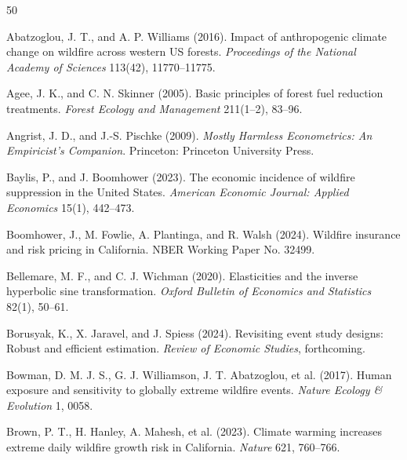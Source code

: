 \documentclass[12pt, letterpaper]{article}
\begin{document}
\newpage
\singlespacing

\begin{thebibliography}{50}

Abatzoglou, J. T., and A. P. Williams (2016). Impact of anthropogenic climate change on wildfire across western US forests. \textit{Proceedings of the National Academy of Sciences} 113(42), 11770--11775.

Agee, J. K., and C. N. Skinner (2005). Basic principles of forest fuel reduction treatments. \textit{Forest Ecology and Management} 211(1--2), 83--96.

Angrist, J. D., and J.-S. Pischke (2009). \textit{Mostly Harmless Econometrics: An Empiricist's Companion}. Princeton: Princeton University Press.

Baylis, P., and J. Boomhower (2023). The economic incidence of wildfire suppression in the United States. \textit{American Economic Journal: Applied Economics} 15(1), 442--473.

Boomhower, J., M. Fowlie, A. Plantinga, and R. Walsh (2024). Wildfire insurance and risk pricing in California. NBER Working Paper No. 32499.

Bellemare, M. F., and C. J. Wichman (2020). Elasticities and the inverse hyperbolic sine transformation. \textit{Oxford Bulletin of Economics and Statistics} 82(1), 50--61.

Borusyak, K., X. Jaravel, and J. Spiess (2024). Revisiting event study designs: Robust and efficient estimation. \textit{Review of Economic Studies}, forthcoming.

Bowman, D. M. J. S., G. J. Williamson, J. T. Abatzoglou, et al. (2017). Human exposure and sensitivity to globally extreme wildfire events. \textit{Nature Ecology \& Evolution} 1, 0058.

Brown, P. T., H. Hanley, A. Mahesh, et al. (2023). Climate warming increases extreme daily wildfire growth risk in California. \textit{Nature} 621, 760--766.


\end{thebibliography}
\end{document}
